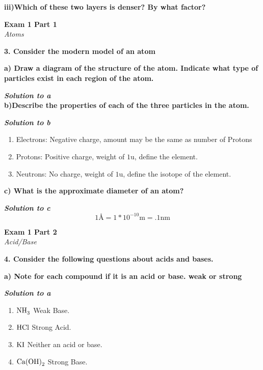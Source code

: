 \documentclass{article}
\begin{document}
    \textbf{iii)Which of these two layers is denser? By what factor?}

    \pagebreak

    \begin{center}
        \textbf{Exam 1 Part 1}\\
        \textit{Atoms}
    \end{center}
    \textbf{3. Consider the modern model of an atom}

    \textbf{a) Draw a diagram of the structure of the atom. Indicate what type of particles exist in each region of the atom.}

    \textbf{\textit{Solution to a}}\\[3cm]

    \textbf{b)Describe the properties of each of the three particles in the atom.}

    \textbf{\textit{Solution to b}}
    \begin{enumerate}
        \item Electrons: Negative charge, amount may be the same as number of Protons
        \item Protons: Positive charge, weight of $1 \si{\atomicmassunit}$, define the element.
        \item Neutrons: No charge, weight of $1 \si{\atomicmassunit}$, define the isotope of the element.\\[1cm]
    \end{enumerate}

    \textbf{c) What is the approximate diameter of an atom?}

    \textbf{\textit{Solution to c}}
    $$ 1 \si{\angstrom} = 1 * 10^{-10} \si{\meter} = .1 \si{\nano\meter} $$
    \pagebreak

    \begin{center}
        \textbf{Exam 1 Part 2}\\
        \textit{Acid/Base}
    \end{center}
    \textbf{4. Consider the following questions about acids and bases.}

    \textbf{a) Note for each compound if it is an acid or base. weak or strong}

    \textbf{\textit{Solution to a}}
    \begin{enumerate}
        \item $\ce{NH3}$ Weak Base.
        \item $\ce{HCl}$ Strong Acid.
        \item $\ce{KI}$ Neither an acid or base.
        \item $\ce{Ca(OH)2}$ Strong Base.
    \end{enumerate}
\end{document}
